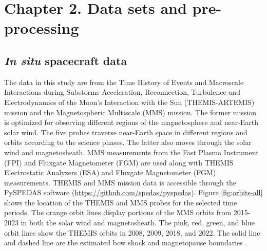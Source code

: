 \chapter{Chapter 2. Data sets and pre-processing}

\section{\textit{In situ} spacecraft data}
The data in this study are from the Time History of Events and Macroscale Interactions during Substorms-Acceleration, Reconnection, Turbulence and Electrodynamics of the Moon’s Interaction with the Sun (THEMIS-ARTEMIS) mission  and the Magnetospheric Multiscale (MMS) mission. The former mission is optimized for observing different regions of the magnetosphere and near-Earth solar wind. The five probes traverse near-Earth space in different regions and orbits according to the science phases. The latter also moves through the solar wind and magnetosheath. MMS measurements from the Fast Plasma Instrument (FPI) and Fluxgate Magnetometer (FGM) are used along with THEMIS Electrostatic Analyzers (ESA) and Fluxgate Magnetometer (FGM) measurements. THEMIS and MMS mission data is accessible through the PySPEDAS software (\url{https://github.com/spedas/pyspedas}). Figure \ref{fig:orbits-all} shows the location of the THEMIS and MMS probes for the selected time periods. The orange orbit lines display portions of the MMS orbits from 2015-2023 in both the solar wind and magnetosheath. The pink, red, green, and blue orbit lines show the THEMIS orbits in 2008, 2009, 2018, and 2022. The solid line and dashed line are the estimated bow shock and magnetopause boundaries \cite{SlavinHolzer:1984,Shue:1997}. %


